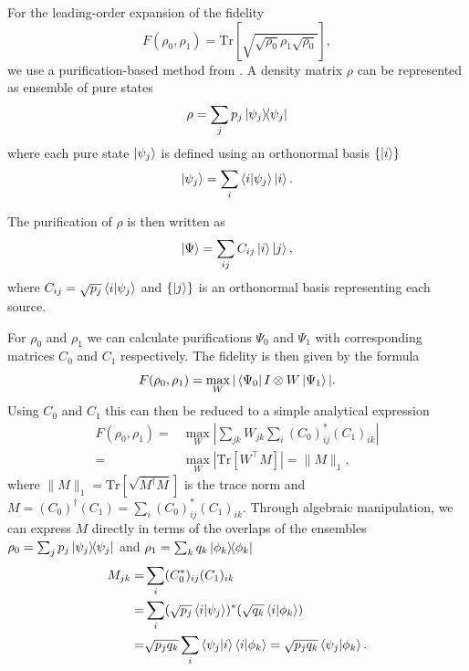 \documentclass[reprint,amsmath,amssymb,aps,prl,floatfix,groupedaddress,superscriptaddress]{revtex4-2}
\begin{document}
For the leading-order expansion of the fidelity
\begin{equation}
F(\rho_0, \rho_1) = \text{Tr}\left[ \sqrt{\sqrt{\rho_0} \rho_1 \sqrt{\rho_0}}\right],
\end{equation}
we use a purification-based method from  \cite{lupo2020quantum}. A density matrix $\rho$ can be represented as ensemble of pure states
\begin{equation}
    \rho = \sum_j p_j \ketbra{\psi_j}{\psi_j}
\end{equation}
where each pure state $\ket{\psi_j}$ is defined using an orthonormal basis $\{\ket{i}\}$
\begin{equation}
\ket{\psi_j} = \sum_i \braket{i}{\psi_j} \ket{i}.
\end{equation}

The purification of $\rho$ is then written as
\begin{equation}
\ket{\Psi} = \sum_{ij} C_{ij} \ket{i} \ket{j},
\end{equation}
where $C_{ij} = \sqrt{p_j} \braket{i}{\psi_j}$ and $\{\ket{j}\}$ is an orthonormal basis representing each source.

For $\rho_0$ and $\rho_1$ we can calculate purifications $\Psi_0$ and $\Psi_1$ with corresponding matrices $C_0$ and $C_1$ respectively. The fidelity is then given by the formula
\begin{equation}
F(\rho_0, \rho_1) = \max_W |\bra{\Psi_0} I \otimes W \ket{\Psi_1}|.
\end{equation}
Using $C_0$ and $C_1$ this can then be reduced to a simple analytical expression
\begin{equation}
\begin{aligned}
F(\rho_0, \rho_1) =& \max_W \left| \sum_{jk} W_{jk} \sum_{i} (C_0)^*_{ij} (C_1)_{ik} \right| \\
=& \max_W \left| \text{Tr}[W^\top M] \right| = \|M\|_1,
\end{aligned}
\end{equation}
where $\|M\|_1 = \text{Tr}[\sqrt{M^\dagger M}]$ is the trace norm and $M = (C_0)^\dagger (C_1) = \sum_i (C_0)^*_{ij} (C_1)_{ik}$.
Through algebraic manipulation, we can express $M$ directly in terms of the overlaps of the ensembles $\rho_0 = \sum_j p_j \ketbra{\psi_j}{\psi_j}$ and $\rho_1  = \sum_k q_k \ketbra{\phi_k}{\phi_k}$
\begin{equation}
\begin{aligned}
M_{jk} =& \sum_i (C_0^*)_{ij} (C_1)_{ik}\\
= & \sum_{i} (\sqrt{p_j}\braket{i}{\psi_j})^*(\sqrt{q_k} \braket{i}{\phi_k})\\
= & \sqrt{p_j q_k} \sum_i \braket{\psi_j}{i} \braket{i}{\phi_k} = \sqrt{p_j q_k} \braket{\psi_j}{\phi_k}.
\end{aligned}
\end{equation}
\end{document}
